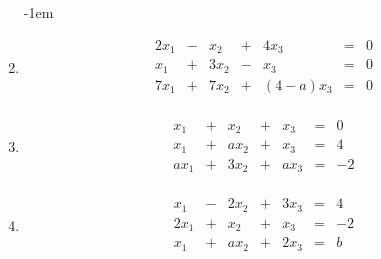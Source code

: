 			\begin{enumerate}\abovedisplayskip-1em
				\item
				
					\[
						\begin{array} {ccccccc}
							2 x_1 & - & x_2 & + & 4 x_3 & = & 0 \\
							x_1 & + & 3 x_2 & - & x_3 & = & 0\\
							7 x_1 & + & 7 x_2 & + & (4-a) x_3 & = & 0\\
						\end{array}
					\]
						
				\item
					
					\[
						\begin{array} {ccccccc}
							x_1 & + & x_2 & + & x_3 & = & 0 \\
							x_1 & + & a x_2 & + & x_3 & = & 4\\
							a x_1 & + & 3 x_2 & + & a x_3 & = & -2\\
						\end{array}
					\]
					
				\item
					
					\[
						\begin{array} {ccccccc}
							x_1 & - & 2 x_2 & + & 3 x_3 & = & 4 \\
							2 x_1 & + & x_2 & + & x_3 & = & -2\\
							x_1 & + & a x_2 & + & 2 x_3 & = & b\\
						\end{array}
					\]
					
			\end{enumerate}

